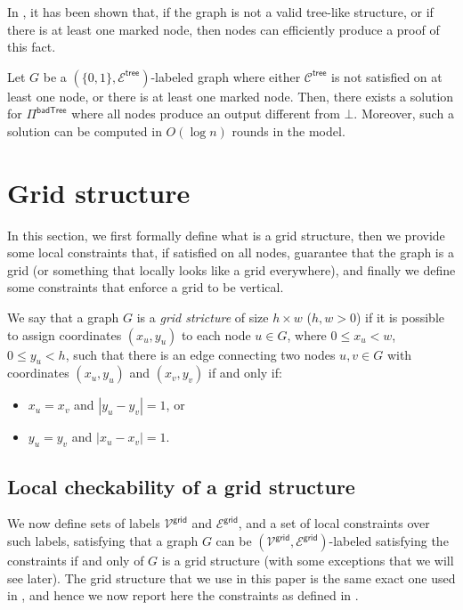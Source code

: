 \documentclass[11pt]{article}
\newcommand{\lgrid}{\mathsf {grid}}
\newcommand{\ltreelike}{\mathsf {tree}}
\newcommand{\lbadtree}{\mathsf {badTree}}
\begin{document}
In \cite{congest-lcls}, it has been shown that, if the graph is not a valid tree-like structure, or if there is at least one marked node, then nodes can efficiently produce a proof of this fact.
\begin{lemma}\label{lem:prove-tree-invalid}
	Let $G$ be a $(\{0,1\},\mathcal{E^\ltreelike})$-labeled graph where either $\mathcal{C}^{\ltreelike}$ is not satisfied on at least one node, or there is at least one marked node. Then, there exists a solution for $\Pi^{\lbadtree}$ where all nodes produce an output different from $\bot$. Moreover, such a solution can be computed in $O(\log n)$ rounds in the \local model.
\end{lemma}

\section{Grid structure}\label{sec:grid}
In this section, we first formally define what is a grid structure, then we provide some local constraints that, if satisfied on all nodes, guarantee that the graph is a grid (or something that locally looks like a grid everywhere), and finally we define some constraints that enforce a grid to be vertical.

\begin{definition}
	We say that a graph $G$ is a \emph{grid stricture} of size $h\times w$ ($h,w>0$) if it is possible to assign coordinates $(x_u, y_u)$ to each node $u\in G$, where $0\le x_u < w$, $0 \le y_u < h$, such that there is an edge connecting two nodes $u,v\in G$ with coordinates $(x_u, y_u)$ and $(x_v, y_v)$ if and only if:
	\begin{itemize}[noitemsep]
		\item $x_u = x_v$ and $|y_u - y_v| = 1$, or
		\item $y_u = y_v$ and $|x_u - x_v| = 1$.
	\end{itemize} 
\end{definition}


\subsection{Local checkability of a grid structure}
We now define sets of labels $\mathcal{V^\lgrid}$ and $\mathcal{E^\lgrid}$, and a set of local constraints over such labels, satisfying that a graph $G$ can be $(\mathcal{V^\lgrid},\mathcal{E^\lgrid})$-labeled satisfying the constraints if and only of $G$ is a grid structure (with some exceptions that we will see later).
The grid structure that we use in this paper is the same exact one used in \cite{congest-lcls}, and hence we now report here the constraints as defined in \cite{congest-lcls}.
\end{document}
